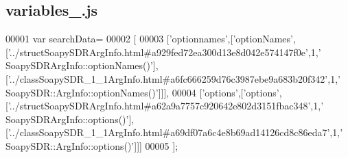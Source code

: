 \subsection{variables\+\_.\+js}
\label{variables__4_8js_source}

\begin{DoxyCode}
00001 var searchData=
00002 [
00003   [\textcolor{stringliteral}{'optionnames'},[\textcolor{stringliteral}{'optionNames'},[\textcolor{stringliteral}{'../structSoapySDRArgInfo.html#a929fed72ea300d13e8d042e574147f0e'},1,\textcolor{stringliteral}{'
      SoapySDRArgInfo::optionNames()'}],[\textcolor{stringliteral}{'../classSoapySDR\_1\_1ArgInfo.html#a6fc666259d76c3987ebe9a683b20f342'},1,\textcolor{stringliteral}{'
      SoapySDR::ArgInfo::optionNames()'}]]],
00004   [\textcolor{stringliteral}{'options'},[\textcolor{stringliteral}{'options'},[\textcolor{stringliteral}{'../structSoapySDRArgInfo.html#a62a9a7757c920642e802d3151fbac348'},1,\textcolor{stringliteral}{'
      SoapySDRArgInfo::options()'}],[\textcolor{stringliteral}{'../classSoapySDR\_1\_1ArgInfo.html#a69df07a6c4e8b69ad14126cd8c86eda7'},1,\textcolor{stringliteral}{'
      SoapySDR::ArgInfo::options()'}]]]
00005 ];
\end{DoxyCode}
